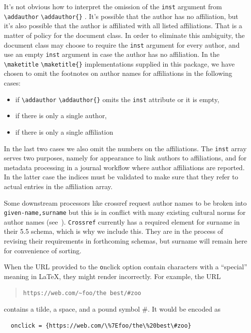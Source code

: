 \documentclass{article}
\newcommand{\cmd}[2][]{%
  \def\FirstArg{#1}%
  \ifx\FirstArg\empty%
    \texttt{\textbackslash{}#2}%
  \else%
    \texttt{\textbackslash{}#2\{#1\}}%
  \fi
}
\newcommand{\todok}[1]{\todo[inline,color=green!20]{K: #1}}
\begin{document}
It's not obvious how to interpret the omission of the \texttt{inst} argument from
\cmd{addauthor}.
It's possible that the author has no affiliation, but it's also possible that the author
is affiliated with all listed affiliations. That is a matter of policy for the document
class. In order to eliminate this ambiguity, the document class may choose to require the
\texttt{inst} argument for every author, and use an empty \texttt{inst} argument in case
the author has no affiliation. In the \cmd{maketitle} implementations supplied in this
package, we have chosen to omit the footnotes on author names for affiliations in the following cases:
\begin{itemize}
\item if \cmd{addauthor} omits the \texttt{inst} attribute or it is empty,
\item if there is only a single author,
\item if there is only a single affiliation
\end{itemize}
In the last two cases we also omit the numbers on the affiliations. The \texttt{inst}
array serves two purposes, namely for appearance to link authors to affiliations, and
for metadata processing in a journal workflow where author affiliations are reported.
In the latter case the indices must be validated to make sure that they refer to actual
entries in the affiliation array.

Some downstream processors like crossref request author names to be broken
into \texttt{given-name,surname} but this is in conflict with many existing
cultural norms for author names (see~\cite{falsehoods}).
\texttt{Crossref} currently has a required element for
surname in their 5.5 schema, which is why we include this. They are
in the process of revising their requirements in forthcoming schemas, but
surname will remain here for convenience of sorting.

When the URL provided to the {\texttt onclick} option contain characters
with a ``special'' meaning in \LaTeX{}, they might render incorrectly.
For example, the URL
\begin{quote}
    \verb+https://web.com/~foo/the best/#zoo+
\end{quote} contains
a tilde, a space, and a pound symbol \#. It would
be encoded as 
\begin{verbatim}
  onclick = {https://web.com/\%7Efoo/the\%20best\#zoo}
\end{verbatim}
\end{document}
